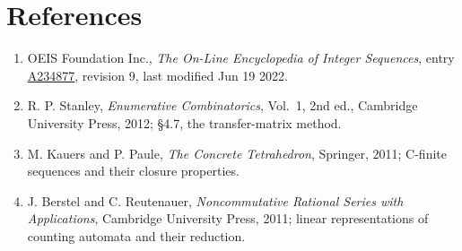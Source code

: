 \documentclass[11pt]{article}
\theoremstyle{definition}
\begin{document}
\section{References}

\begin{enumerate}

\item OEIS Foundation Inc., \emph{The On-Line Encyclopedia of Integer Sequences}, entry \href{https://oeis.org/A234877}{A234877}, revision 9, last modified Jun 19 2022.

\item R. P. Stanley, \emph{Enumerative Combinatorics}, Vol.~1, 2nd ed., Cambridge University Press, 2012; \S4.7, the transfer-matrix method.

\item M. Kauers and P. Paule, \emph{The Concrete Tetrahedron}, Springer, 2011; C-finite sequences and their closure properties.

\item J. Berstel and C. Reutenauer, \emph{Noncommutative Rational Series with Applications}, Cambridge University Press, 2011; linear representations of counting automata and their reduction.

\end{enumerate}
\end{document}
